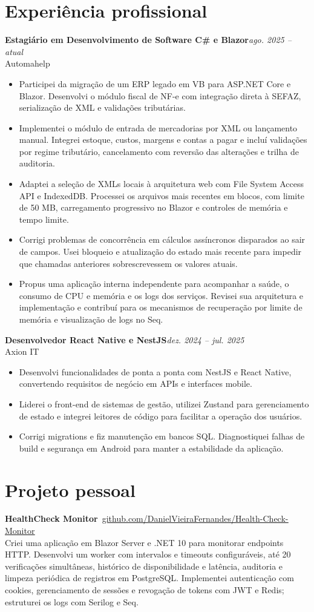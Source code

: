 \documentclass[11pt,a4paper]{article}
\newcommand{\cvlink}[2]{\href{#1}{\underline{#2}}}
\newcommand{\job}[3]{%
  \textbf{#1}\hfill\textit{#2}\\
  #3\par
}
\begin{document}
\section*{Experiência profissional}
\job{Estagiário em Desenvolvimento de Software C\# e Blazor}{ago. 2025 -- atual}{Automahelp}
\begin{itemize}
  \item Participei da migração de um ERP legado em VB para ASP.NET Core e Blazor. Desenvolvi o módulo fiscal de NF-e com integração direta à SEFAZ, serialização de XML e validações tributárias.
  \item Implementei o módulo de entrada de mercadorias por XML ou lançamento manual. Integrei estoque, custos, margens e contas a pagar e incluí validações por regime tributário, cancelamento com reversão das alterações e trilha de auditoria.
  \item Adaptei a seleção de XMLs locais à arquitetura web com File System Access API e IndexedDB. Processei os arquivos mais recentes em blocos, com limite de 50 MB, carregamento progressivo no Blazor e controles de memória e tempo limite.
  \item Corrigi problemas de concorrência em cálculos assíncronos disparados ao sair de campos. Usei bloqueio e atualização do estado mais recente para impedir que chamadas anteriores sobrescrevessem os valores atuais.
  \item Propus uma aplicação interna independente para acompanhar a saúde, o consumo de CPU e memória e os logs dos serviços. Revisei sua arquitetura e implementação e contribuí para os mecanismos de recuperação por limite de memória e visualização de logs no Seq.
\end{itemize}
\newpage
\job{Desenvolvedor React Native e NestJS}{dez. 2024 -- jul. 2025}{Axion IT}
\begin{itemize}
  \item Desenvolvi funcionalidades de ponta a ponta com NestJS e React Native, convertendo requisitos de negócio em APIs e interfaces mobile.
  \item Liderei o front-end de sistemas de gestão, utilizei Zustand para gerenciamento de estado e integrei leitores de código para facilitar a operação dos usuários.
  \item Corrigi migrations e fiz manutenção em bancos SQL. Diagnostiquei falhas de build e segurança em Android para manter a estabilidade da aplicação.
\end{itemize}
\section*{Projeto pessoal}
\textbf{HealthCheck Monitor} \hfill \faGithub\,\cvlink{https://github.com/DanielVieiraFernandes/Health-Check-Monitor}{github.com/DanielVieiraFernandes/Health-Check-Monitor}\\
Criei uma aplicação em Blazor Server e .NET 10 para monitorar endpoints HTTP. Desenvolvi um worker com intervalos e timeouts configuráveis, até 20 verificações simultâneas, histórico de disponibilidade e latência, auditoria e limpeza periódica de registros em PostgreSQL. Implementei autenticação com cookies, gerenciamento de sessões e revogação de tokens com JWT e Redis; estruturei os logs com Serilog e Seq.
\end{document}
